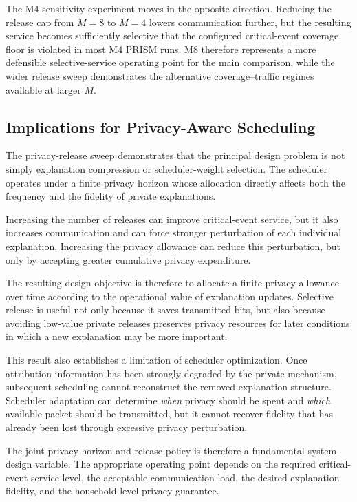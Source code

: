 \documentclass[11pt]{article}
\begin{document}
The M4 sensitivity experiment moves in the opposite direction. Reducing the release cap from \(M=8\) to \(M=4\) lowers communication further, but the resulting service becomes sufficiently selective that the configured critical-event coverage floor is violated in most M4 PRISM runs. M8 therefore represents a more defensible selective-service operating point for the main comparison, while the wider release sweep demonstrates the alternative coverage--traffic regimes available at larger \(M\).

\subsection{Implications for Privacy-Aware Scheduling}

The privacy-release sweep demonstrates that the principal design problem is not simply explanation compression or scheduler-weight selection. The scheduler operates under a finite privacy horizon whose allocation directly affects both the frequency and the fidelity of private explanations.

Increasing the number of releases can improve critical-event service, but it also increases communication and can force stronger perturbation of each individual explanation. Increasing the privacy allowance can reduce this perturbation, but only by accepting greater cumulative privacy expenditure.

The resulting design objective is therefore to allocate a finite privacy allowance over time according to the operational value of explanation updates. Selective release is useful not only because it saves transmitted bits, but also because avoiding low-value private releases preserves privacy resources for later conditions in which a new explanation may be more important.

This result also establishes a limitation of scheduler optimization. Once attribution information has been strongly degraded by the private mechanism, subsequent scheduling cannot reconstruct the removed explanation structure. Scheduler adaptation can determine \emph{when} privacy should be spent and \emph{which} available packet should be transmitted, but it cannot recover fidelity that has already been lost through excessive privacy perturbation.

The joint privacy-horizon and release policy is therefore a fundamental system-design variable. The appropriate operating point depends on the required critical-event service level, the acceptable communication load, the desired explanation fidelity, and the household-level privacy guarantee.
\end{document}
